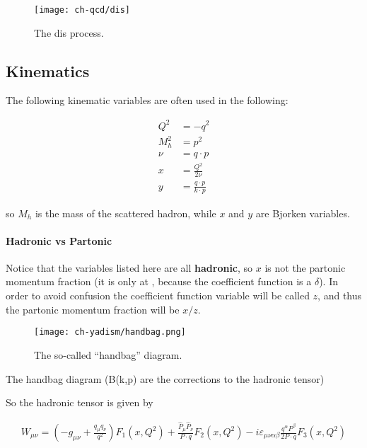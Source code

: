 \begin{figure}
	\centering
	\texttt{[image: ch-qcd/dis]}
	\caption{The \acrfull{dis} process.}
	\label{fig:qcd/dis}
\end{figure}

\subsection{Kinematics}

The following kinematic variables are often used in the following:

\begin{align}
	Q^2   & = - q^2                       \\
	M_h^2 & = p^2                         \\
	\nu   & = q \cdot p                   \\
	x     & = \frac{Q^2}{2\nu}            \\
	y     & = \frac{q \cdot p}{k \cdot p}
\end{align}

so $M_h$ is the mass of the scattered hadron, while $x$ and
$y$ are Bjorken variables.

\paragraph{Hadronic vs Partonic} Notice that the variables listed here
are all \textbf{hadronic}, so $x$ is not the partonic momentum fraction (it is only
at \lo , because the coefficient function is a $\delta$).
In order to avoid confusion the coefficient function variable will be called
$z$, and thus the partonic momentum fraction will be $x/z$.

\begin{figure}
	\centering
	\texttt{[image: ch-yadism/handbag.png]}
  \caption{The so-called \enquote{handbag} diagram.}
\end{figure}

The handbag diagram (B(k,p) are the \qcd corrections to the hadronic tensor)

So the hadronic tensor is given by

\begin{align}
      W_{\mu\nu} = \left(-g_{\mu\nu} + \frac{q_\mu q_\nu}{q^2}\right) F_1(x,Q^2)
                + \frac{\hat P_\mu \hat P_\nu}{P \cdot q} F_2(x,Q^2)
                - i \varepsilon_{\mu\nu\alpha\beta} \frac{q^\alpha P^\beta}{2 P\cdot q} F_3(x,Q^2)
\end{align}

